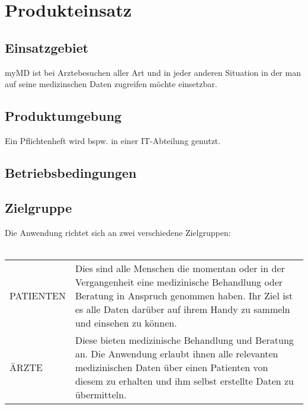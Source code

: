 \documentclass[a4paper]{scrreprt}
\begin{document}
\chapter{Produkteinsatz}

\section{Einsatzgebiet}
myMD ist bei Arztebesuchen aller Art und in jeder anderen Situation in der man auf seine medizinschen Daten zugreifen möchte einsetzbar.
 
\section{Produktumgebung}
Ein Pflichtenheft wird bspw. in einer IT-Abteilung genutzt.

\section{Betriebsbedingungen}
 
 
\section{Zielgruppe}
Die Anwendung richtet sich an zwei verschiedene Zielgruppen:  \\\\
\begin{tabular}{lll}
PATIENTEN &  \multicolumn{2}{p{12cm}}{Dies sind alle Menschen die momentan oder in der Vergangenheit eine medizinische Behandlung oder Beratung in Anspruch genommen haben. Ihr Ziel ist es alle Daten darüber auf ihrem Handy zu sammeln und einsehen zu können.}\\
ÄRZTE &  \multicolumn{2}{p{12cm}}{Diese bieten medizinische Behandlung und Beratung an. Die Anwendung erlaubt ihnen alle relevanten medizinischen Daten über einen Patienten von diesem zu erhalten und ihm selbst erstellte Daten zu übermitteln.}  \\
\end{tabular}
\end{document}

